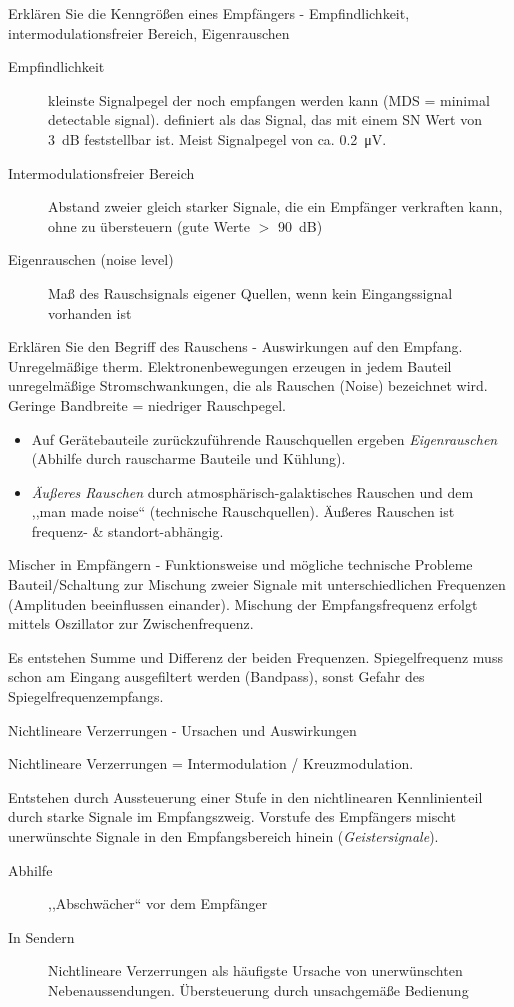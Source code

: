 \documentclass[avery5371,grid,frame,a4paper]{flashcards}
\newcommand{\card}[3]{
  \begin{flashcard}[{\chap} -- #1]{#2}#3\end{flashcard}
}
\begin{document}
\card{39}{Erklären Sie die Kenngrößen eines Empfängers - Empfindlichkeit, intermodulationsfreier Bereich, Eigenrauschen}{
  \small
  \begin{description}
    \item[Empfindlichkeit]
      kleinste Signalpegel der noch empfangen werden kann (MDS = minimal detectable signal).
      definiert als das Signal, das mit einem SN Wert von \SI{3}{\dB} feststellbar ist.
      Meist Signalpegel von ca. \SI{0,2}{\micro\volt}.
    \item[Intermodulationsfreier Bereich]
      Abstand zweier gleich starker Signale, die ein Empfänger verkraften kann, ohne zu übersteuern
      (gute Werte $>$ \SI{90}{\dB})
    \item[Eigenrauschen (noise level)]
      Maß des Rauschsignals eigener Quellen, wenn kein Eingangssignal vorhanden ist
  \end{description}
}
\card{40}{Erklären Sie den Begriff des Rauschens - Auswirkungen auf den Empfang.}{
  \small
  Unregelmäßige therm. Elektronenbewegungen erzeugen in jedem Bauteil unregelmäßige Stromschwankungen, die als Rauschen (Noise) bezeichnet wird. Geringe Bandbreite = niedriger Rauschpegel.

  \begin{itemize} 
    \item Auf Gerätebauteile zurückzuführende Rauschquellen ergeben \emph{Eigenrauschen} (Abhilfe durch rauscharme Bauteile und Kühlung).
    \item \emph{Äußeres Rauschen} durch atmosphärisch-galaktisches Rauschen und dem ,,man made noise`` (technische Rauschquellen). Äußeres Rauschen ist frequenz- \& standort-abhängig.
  \end{itemize}
}
\card{41}{Mischer in Empfängern - Funktionsweise und mögliche technische Probleme}{
  Bauteil/Schaltung zur Mischung zweier Signale mit unterschiedlichen Frequenzen (Amplituden beeinflussen einander). Mischung der Empfangsfrequenz erfolgt mittels Oszillator zur Zwischenfrequenz.

  Es entstehen Summe und Differenz der beiden Frequenzen.
  Spiegelfrequenz muss schon am Eingang ausgefiltert werden (Bandpass),
  sonst Gefahr des Spiegelfrequenzempfangs.
}
\card{42}{Nichtlineare Verzerrungen - Ursachen und Auswirkungen}{
  \small
  \item
  Nichtlineare Verzerrungen = Intermodulation / Kreuzmodulation.

  \item
  Entstehen durch Aussteuerung einer Stufe in den nichtlinearen Kennlinienteil durch starke Signale im Empfangszweig. Vorstufe des Empfängers mischt unerwünschte Signale in den Empfangsbereich hinein (\emph{Geistersignale}).

  \begin{description}
    \item[Abhilfe] ,,Abschwächer`` vor dem Empfänger
    \item[In Sendern]
      Nichtlineare Verzerrungen als häufigste Ursache von unerwünschten Nebenaussendungen.
      Übersteuerung durch unsachgemäße Bedienung
  \end{description}
}
\end{document}
